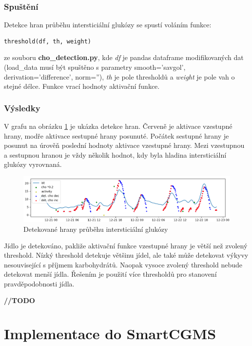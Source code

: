 \subsubsection{Spuštění}

Detekce hran průběhu intersticiální glukózy se spustí voláním funkce:
\begin{verbatim}
threshold(df, th, weight)
\end{verbatim}
ze souboru \textbf{cho\_detection.py}, kde \textit{df} je pandas dataframe modifikovaných dat (load\_data musí být spuštěno s parametry smooth='savgol', derivation='difference', norm=''), \textit{th} je pole thresholdů a \textit{weight} je pole vah o stejné délce. Funkce vrací hodnoty aktivační funkce.

\subsubsection{Výsledky}
V grafu na obrázku \ref{fig:hrany} je ukázka detekce hran. Červeně je aktivace vzestupné hrany, modře aktivace sestupné hrany posunuté. Počátek sestupné hrany je posunut na úrověň poslední hodnoty aktivace vzestupné hrany. Mezi vzestupnou a sestupnou hranou je vždy několik hodnot, kdy byla hladina intersticiální glukózy vyrovnaná.

\begin{figure}[H]
\caption{Detekované hrany průběhu intersticiální glukózy}
\label{fig:hrany}
\centering
\includegraphics[width=1\textwidth]{img/cho/hrany.png}
\end{figure}

Jídlo je detekováno, pakliže aktivační funkce vzestupné hrany je větší než zvolený threshold. Nízký threshold detekuje většinu jídel, ale také může detekovat výkyvy nesouvisející s příjmem karbohydrátů. Naopak vysoce zvolený threshold nebude detekovat menší jídla. Řešením je použití více thresholdů pro stanovení pravděpodobnosti jídla.

\textbf{//TODO}



\section{Implementace do SmartCGMS}

